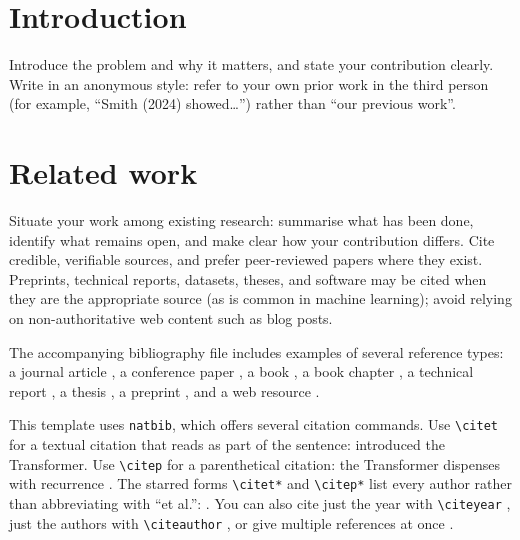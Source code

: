 \documentclass[11pt,a4paper]{article}
\begin{document}
\maketitle

\begin{center}
\end{center}

\begin{abstract}
Write a short abstract here, roughly 150--250 words: the
problem, your approach, and your main result, in plain
language. Do not include anything that identifies you or your
institution.
\end{abstract}

\section{Introduction}
Introduce the problem and why it matters, and state your
contribution clearly. Write in an anonymous style: refer to
your own prior work in the third person (for example,
``Smith (2024) showed\ldots'') rather than ``our previous
work''.

\section{Related work}
Situate your work among existing research: summarise what has
been done, identify what remains open, and make clear how your
contribution differs. Cite credible, verifiable sources, and
prefer peer-reviewed papers where they exist. Preprints,
technical reports, datasets, theses, and software may be cited
when they are the appropriate source (as is common in machine
learning); avoid relying on non-authoritative web content such
as blog posts.

The accompanying bibliography file includes examples of several
reference types: a journal article \cite{lecun2015deep}, a
conference paper \cite{vaswani2017attention}, a book
\cite{russell2020aima}, a book chapter \cite{rumelhart1986learning},
a technical report \cite{krizhevsky2009cifar}, a thesis
\cite{sutton1984thesis}, a preprint \cite{devlin2018bert}, and a
web resource \cite{turing1950webexample}.

This template uses \texttt{natbib}, which offers several citation
commands. Use \verb|\citet| for a textual citation that reads as
part of the sentence: \citet{vaswani2017attention} introduced the
Transformer. Use \verb|\citep| for a parenthetical citation: the
Transformer dispenses with recurrence \citep{vaswani2017attention}.
The starred forms \verb|\citet*| and \verb|\citep*| list every
author rather than abbreviating with ``et al.'':
\citep*{vaswani2017attention}. You can also cite just the year with
\verb|\citeyear| \citeyear{lecun2015deep}, just the authors with
\verb|\citeauthor| \citeauthor{lecun2015deep}, or give multiple
references at once \citep{lecun2015deep, devlin2018bert}.
\end{document}
